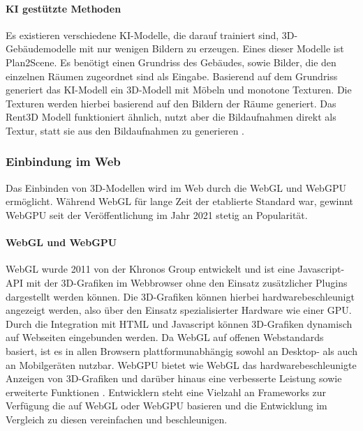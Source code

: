 \paragraph{KI gestützte Methoden}
Es existieren verschiedene \ac{KI}-Modelle, die darauf trainiert sind, 3D-Gebäudemodelle mit nur wenigen Bildern zu erzeugen. Eines dieser Modelle ist Plan2Scene. Es benötigt einen Grundriss des Gebäudes, sowie Bilder, die den einzelnen Räumen zugeordnet sind als Eingabe. Basierend auf dem Grundriss generiert das \ac{KI}-Modell ein 3D-Modell mit Möbeln und monotone Texturen. Die Texturen werden hierbei basierend auf den Bildern der Räume generiert.\cite[S.~10733]{Plan2Scene2021} Das Rent3D Modell funktioniert ähnlich, nutzt aber die Bildaufnahmen direkt als Textur, statt sie aus den Bildaufnahmen zu generieren \cite[S.~3413]{Rent3D2015}.

\subsubsection{Einbindung im Web}
Das Einbinden von 3D-Modellen wird im Web durch die \ac{WebGL} und WebGPU ermöglicht. Während \ac{WebGL} für lange Zeit der etablierte Standard war, gewinnt WebGPU seit der Veröffentlichung im Jahr 2021 stetig an Popularität.

\paragraph{WebGL und WebGPU}
\ac{WebGL} wurde 2011 von der Khronos Group entwickelt und ist eine Javascript-API mit der 3D-Grafiken im Webbrowser ohne den Einsatz zusätzlicher Plugins dargestellt werden können. Die 3D-Grafiken können hierbei hardwarebeschleunigt angezeigt werden, also über den Einsatz spezialisierter Hardware wie einer \ac{GPU}. Durch die Integration mit HTML und Javascript können 3D-Grafiken dynamisch auf Webseiten eingebunden werden. Da \ac{WebGL} auf offenen Webstandards basiert, ist es in allen Browsern plattformunabhängig sowohl an Desktop- als auch an Mobilgeräten nutzbar.\cite[S.~17-19]{Parisi2014} WebGPU bietet wie WebGL das hardwarebeschleunigte Anzeigen von 3D-Grafiken und darüber hinaus eine verbesserte Leistung sowie erweiterte Funktionen \cite{Surma2022}. Entwicklern steht eine Vielzahl an Frameworks zur Verfügung die auf \ac{WebGL} oder WebGPU basieren \cite{Seguin2024} und die Entwicklung im Vergleich zu diesen vereinfachen und beschleunigen.


